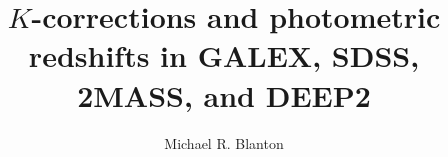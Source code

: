 \documentclass[10pt,preprint]{aastex}
\begin{document}
 
\title{$K$-corrections and photometric redshifts in GALEX, SDSS,
2MASS, and DEEP2}

\author{
Michael R. Blanton\altaffilmark{\ref{NYU}}
}
\end{document}

